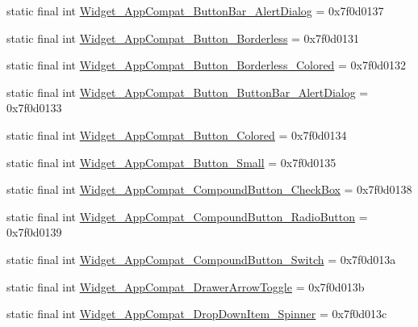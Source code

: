 \begin{DoxyCompactItemize}
static final int \mbox{\hyperlink{classandroid_1_1support_1_1design_1_1_r_1_1style_a1669094c1cf6c300843ff1c554d9d2ba}{Widget\+\_\+\+App\+Compat\+\_\+\+Button\+Bar\+\_\+\+Alert\+Dialog}} = 0x7f0d0137
\item 
static final int \mbox{\hyperlink{classandroid_1_1support_1_1design_1_1_r_1_1style_a6f73304db4302454d7a331fddc2d0b53}{Widget\+\_\+\+App\+Compat\+\_\+\+Button\+\_\+\+Borderless}} = 0x7f0d0131
\item 
static final int \mbox{\hyperlink{classandroid_1_1support_1_1design_1_1_r_1_1style_a2d2f9169d12a7058fde5ebccb9fdae07}{Widget\+\_\+\+App\+Compat\+\_\+\+Button\+\_\+\+Borderless\+\_\+\+Colored}} = 0x7f0d0132
\item 
static final int \mbox{\hyperlink{classandroid_1_1support_1_1design_1_1_r_1_1style_a79f768ac5e0d81d2a2f6f9f64bd7c352}{Widget\+\_\+\+App\+Compat\+\_\+\+Button\+\_\+\+Button\+Bar\+\_\+\+Alert\+Dialog}} = 0x7f0d0133
\item 
static final int \mbox{\hyperlink{classandroid_1_1support_1_1design_1_1_r_1_1style_a6e4a95d74c2cb6caf6c4bb7117fbae5e}{Widget\+\_\+\+App\+Compat\+\_\+\+Button\+\_\+\+Colored}} = 0x7f0d0134
\item 
static final int \mbox{\hyperlink{classandroid_1_1support_1_1design_1_1_r_1_1style_a7e35f1376266e8260468088a0dca3b78}{Widget\+\_\+\+App\+Compat\+\_\+\+Button\+\_\+\+Small}} = 0x7f0d0135
\item 
static final int \mbox{\hyperlink{classandroid_1_1support_1_1design_1_1_r_1_1style_a3ea8e6eb9033a7701d539035be6c7f9a}{Widget\+\_\+\+App\+Compat\+\_\+\+Compound\+Button\+\_\+\+Check\+Box}} = 0x7f0d0138
\item 
static final int \mbox{\hyperlink{classandroid_1_1support_1_1design_1_1_r_1_1style_abad9a39b0d877fc07bdd7f7823a25796}{Widget\+\_\+\+App\+Compat\+\_\+\+Compound\+Button\+\_\+\+Radio\+Button}} = 0x7f0d0139
\item 
static final int \mbox{\hyperlink{classandroid_1_1support_1_1design_1_1_r_1_1style_a6d4a76cafe643b9126d663dae6395ae0}{Widget\+\_\+\+App\+Compat\+\_\+\+Compound\+Button\+\_\+\+Switch}} = 0x7f0d013a
\item 
static final int \mbox{\hyperlink{classandroid_1_1support_1_1design_1_1_r_1_1style_ace6cb78b063c9c92ae071d282010bb37}{Widget\+\_\+\+App\+Compat\+\_\+\+Drawer\+Arrow\+Toggle}} = 0x7f0d013b
\item 
static final int \mbox{\hyperlink{classandroid_1_1support_1_1design_1_1_r_1_1style_a875e226c161599fb44f162ca86831ab9}{Widget\+\_\+\+App\+Compat\+\_\+\+Drop\+Down\+Item\+\_\+\+Spinner}} = 0x7f0d013c

\end{DoxyCompactItemize}
